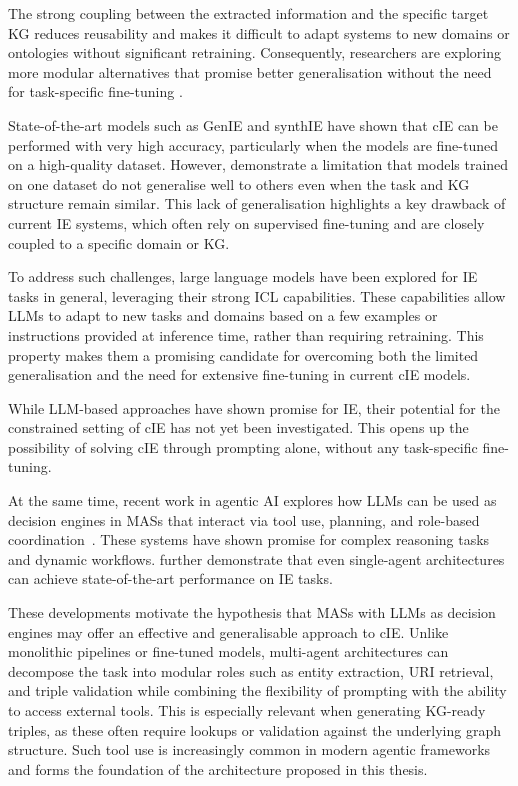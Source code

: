 \documentclass[a4paper,oneside,bibliography=totoc]{scrbook}
\begin{document}
The strong coupling between the extracted information and the specific target \ac{KG} reduces reusability and makes it difficult to adapt systems to new domains or ontologies without significant retraining. Consequently, researchers are exploring more modular alternatives that promise better generalisation without the need for task-specific fine-tuning \cite{Shi2024}.

State-of-the-art models such as GenIE \cite{Josifoski2021} and synthIE \cite{Josifoski2023} have shown that \ac{cIE} can be performed with very high accuracy, particularly when the models are fine-tuned on a high-quality dataset. However, \citet{Josifoski2021,Josifoski2023} demonstrate a limitation that models trained on one dataset do not generalise well to others even when the task and \ac{KG} structure remain similar. This lack of generalisation highlights a key drawback of current \ac{IE} systems, which often rely on supervised fine-tuning and are closely coupled to a specific domain or \ac{KG}.

To address such challenges, large language models have been explored for \ac{IE} tasks in general, leveraging their strong \ac{ICL} capabilities. These capabilities allow \acp{LLM} to adapt to new tasks and domains based on a few examples or instructions provided at inference time, rather than requiring retraining. This property makes them a promising candidate for overcoming both the limited generalisation and the need for extensive fine-tuning in current \ac{cIE} models.

While LLM-based approaches have shown promise for \ac{IE}, their potential for the constrained setting of \ac{cIE} has not yet been investigated. This opens up the possibility of solving \ac{cIE} through prompting alone, without any task-specific fine-tuning.

At the same time, recent work in agentic AI explores how \acp{LLM} can be used as decision engines in \acp{MAS} that interact via tool use, planning, and role-based coordination~\cite{OpenAI2025,Anthropic2024,Wiesinger2025}. These systems have shown promise for complex reasoning tasks and dynamic workflows. \citet{Shi2024} further demonstrate that even single-agent architectures can achieve state-of-the-art performance on \ac{IE} tasks.

These developments motivate the hypothesis that \acp{MAS} with \acp{LLM} as decision engines may offer an effective and generalisable approach to \ac{cIE}. Unlike monolithic pipelines or fine-tuned models, multi-agent architectures can decompose the task into modular roles such as entity extraction, \ac{URI} retrieval, and triple validation while combining the flexibility of prompting with the ability to access external tools. This is especially relevant when generating \ac{KG}-ready triples, as these often require lookups or validation against the underlying graph structure. Such tool use is increasingly common in modern agentic frameworks \cite{OpenAI2025} and forms the foundation of the architecture proposed in this thesis.
\end{document}
